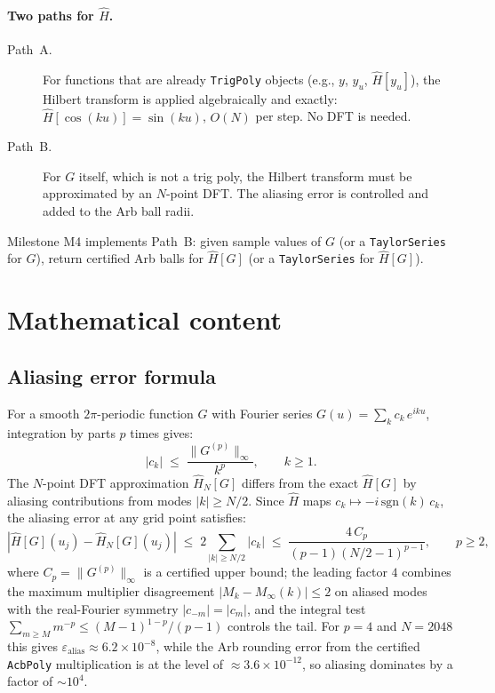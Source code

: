\documentclass[11pt]{article}
\theoremstyle{definition}
\begin{document}
\paragraph{Two paths for $\hat H$.}
\begin{description}
  \item[Path~A.] For functions that are already \texttt{TrigPoly} objects
    (e.g., $y$, $y_u$, $\hat H[y_u]$), the Hilbert transform is applied
    algebraically and exactly: $\hat H[\cos(ku)] = \sin(ku)$, $O(N)$ per step.
    No DFT is needed.
  \item[Path~B.] For $G$ itself, which is not a trig poly, the Hilbert transform
    must be approximated by an $N$-point DFT.  The aliasing error is controlled
    and added to the Arb ball radii.
\end{description}

Milestone M4 implements Path~B: given sample values of $G$ (or a
\texttt{TaylorSeries} for $G$), return certified Arb balls for $\hat H[G]$
(or a \texttt{TaylorSeries} for $\hat H[G]$).

\section{Mathematical content}

\subsection{Aliasing error formula}

For a smooth $2\pi$-periodic function $G$ with Fourier series
$G(u) = \sum_k c_k\,e^{iku}$, integration by parts $p$ times gives:
\[
  |c_k| \;\le\; \frac{\|G^{(p)}\|_\infty}{k^p}, \qquad k \ge 1.
\]
The $N$-point DFT approximation $\hat H_N[G]$ differs from the exact
$\hat H[G]$ by aliasing contributions from modes $|k| \ge N/2$.
Since $\hat H$ maps $c_k \mapsto -i\,\mathrm{sgn}(k)\,c_k$, the aliasing
error at any grid point satisfies:
\[
  |\hat H[G](u_j) - \hat H_N[G](u_j)|
  \;\le\; 2\sum_{|k|\ge N/2} |c_k|
  \;\le\; \frac{4\,C_p}{(p-1)(N/2-1)^{p-1}},
  \qquad p \ge 2,
\]
where $C_p = \|G^{(p)}\|_\infty$ is a certified upper bound; the leading
factor $4$ combines the maximum multiplier disagreement $|M_k - M_\infty(k)| \le 2$
on aliased modes with the real-Fourier symmetry $|c_{-m}| = |c_m|$, and the
integral test $\sum_{m \ge M} m^{-p} \le (M{-}1)^{1-p}/(p{-}1)$ controls the
tail.  For $p = 4$ and $N = 2048$ this gives $\varepsilon_{\mathrm{alias}}
\approx 6.2 \times 10^{-8}$, while the Arb rounding error from the certified
\texttt{AcbPoly} multiplication is at the level of $\approx 3.6 \times 10^{-12}$,
so aliasing dominates by a factor of $\sim 10^4$.
\end{document}
